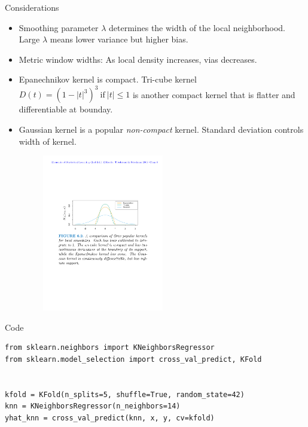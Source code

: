 \documentclass{beamer}
\begin{document}
\begin{frame}{Considerations}
    \begin{itemize}
        \item Smoothing parameter $\lambda$ determines the width of the local neighborhood. Large $\lambda$ means lower variance but higher bias.
        \item Metric window widths: As local density increases, vias decreases.
        \item Epanechnikov kernel is compact. Tri-cube kernel $D(t) = (1-|t|^3)^3\mathrm{~if~}|t| \leq 1$ is another compact kernel that is flatter and differentiable at bounday.
        \item Gaussian kernel is a popular \textit{non-compact} kernel. Standard deviation controls width of kernel.
        \begin{figure}
            \centering
            \includegraphics[width=0.5\textwidth]{figures/kerneltypes.pdf}
        \end{figure}
    \end{itemize}
\end{frame}


\begin{frame}[fragile]{Code}
\begin{verbatim}
from sklearn.neighbors import KNeighborsRegressor
from sklearn.model_selection import cross_val_predict, KFold


kfold = KFold(n_splits=5, shuffle=True, random_state=42)
knn = KNeighborsRegressor(n_neighbors=14)
yhat_knn = cross_val_predict(knn, x, y, cv=kfold)
\end{verbatim}
\end{frame}
\end{document}
